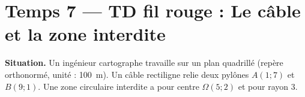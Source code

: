 
\section*{Temps 7 — TD fil rouge : Le câble et la zone interdite}

\textbf{Situation.} Un ingénieur cartographe travaille sur un plan quadrillé (repère orthonormé, unité : 100~m). Un câble rectiligne relie deux pylônes $A(1 ; 7)$ et $B(9 ; 1)$. Une zone circulaire interdite a pour centre $\Omega(5 ; 2)$ et pour rayon $3$.

\bigskip


